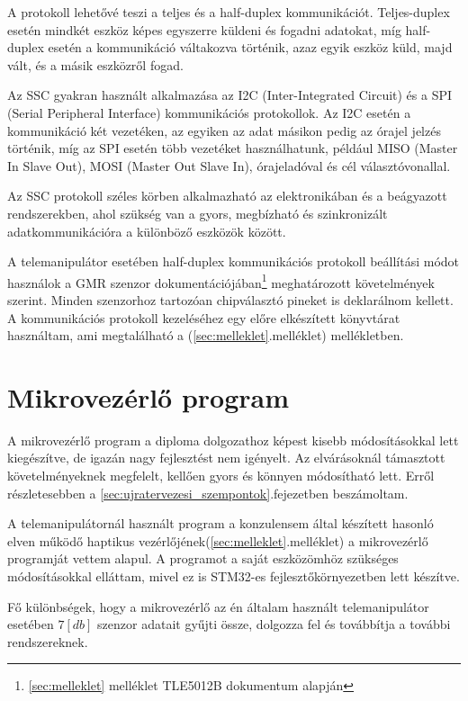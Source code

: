 A protokoll lehetővé teszi a teljes és a half-duplex kommunikációt. Teljes-duplex esetén mindkét eszköz képes egyszerre küldeni és fogadni adatokat, míg half-duplex esetén a kommunikáció váltakozva történik, azaz egyik eszköz küld, majd vált, és a másik eszközről fogad.

Az SSC gyakran használt alkalmazása az I2C (Inter-Integrated Circuit) és a SPI (Serial Peripheral Interface) kommunikációs protokollok. Az I2C esetén a kommunikáció két vezetéken, az egyiken az adat másikon pedig az órajel jelzés  történik, míg az SPI esetén több vezetéket használhatunk, például MISO (Master In Slave Out), MOSI (Master Out Slave In), órajeladóval és cél választóvonallal.

Az SSC protokoll széles körben alkalmazható az elektronikában és a beágyazott rendszerekben, ahol szükség van a gyors, megbízható és szinkronizált adatkommunikációra a különböző eszközök között.

A telemanipulátor esetében half-duplex kommunikációs protokoll beállítási módot használok a GMR szenzor dokumentációjában\footnote{\ref{sec:melleklet} melléklet TLE5012B dokumentum alapján} meghatározott követelmények szerint. Minden szenzorhoz tartozóan chipválasztó pineket is deklarálnom kellett. A kommunikációs protokoll kezeléséhez egy előre elkészített könyvtárat használtam, ami megtalálható a (\ref{sec:melleklet}.melléklet) mellékletben.

\section{Mikrovezérlő program}
\label{sec:MCU_program}

A mikrovezérlő program a diploma dolgozathoz képest kisebb módosításokkal lett kiegészítve, de igazán nagy fejlesztést nem igényelt. Az elvárásoknál támasztott követelményeknek megfelelt, kellően gyors és könnyen módosítható lett. Erről részletesebben a \ref{sec:ujratervezesi_szempontok}.fejezetben beszámoltam.

A telemanipulátornál használt program a konzulensem által készített hasonló elven működő haptikus vezérlőjének(\ref{sec:melleklet}.melléklet) a mikrovezérlő programját vettem alapul. A programot a saját eszközömhöz szükséges módosításokkal elláttam, mivel ez is STM32-es fejlesztőkörnyezetben lett készítve.

Fő különbségek, hogy a mikrovezérlő az én általam használt telemanipulátor esetében $7[db]$ szenzor adatait gyűjti össze, dolgozza fel és továbbítja a további rendszereknek.


